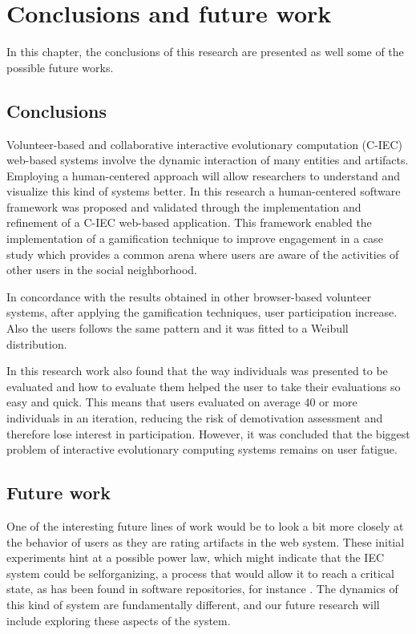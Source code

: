 \chapter{Conclusions and future work} \label{sec:5}

In this chapter, the conclusions of this research are presented as well some of
the possible future works.

\section{Conclusions}

Volunteer-based and collaborative interactive evolutionary computation (C-IEC)
web-based systems involve the dynamic interaction of many entities and
artifacts. Employing a human-centered approach will allow researchers to
understand and visualize this kind of systems better. In this research a
human-centered software framework was proposed and validated through the
implementation and refinement of a C-IEC web-based application. This framework
enabled the implementation of a gamification technique to improve engagement in
a case study which provides a common arena where users are aware of the
activities of other users in the social neighborhood.

In concordance with the results obtained in other browser-based volunteer
systems, after applying the gamification techniques, user participation
increase. Also the users follows the same pattern and it was fitted to a Weibull
distribution.

In this research work also found that the way individuals was presented to be
evaluated and how to evaluate them helped the user to take their evaluations so
easy and quick. This means that users evaluated on average 40 or more
individuals in an iteration, reducing the risk of demotivation assessment and
therefore lose interest in participation. However, it was concluded that the
biggest problem of interactive evolutionary computing systems remains on user
fatigue.


\section{Future work}

One of the interesting future lines of work would be to look a bit more closely at the
behavior of users as they are rating artifacts in the web system. These initial
experiments hint at a possible power law, which might indicate that the IEC
system could be selforganizing, a process that would allow it to reach a
critical state, as has been found in software repositories, for instance \cite{merelo2016self}.
The dynamics of this kind of system are fundamentally different, and our future
research will include exploring these aspects of the system.

